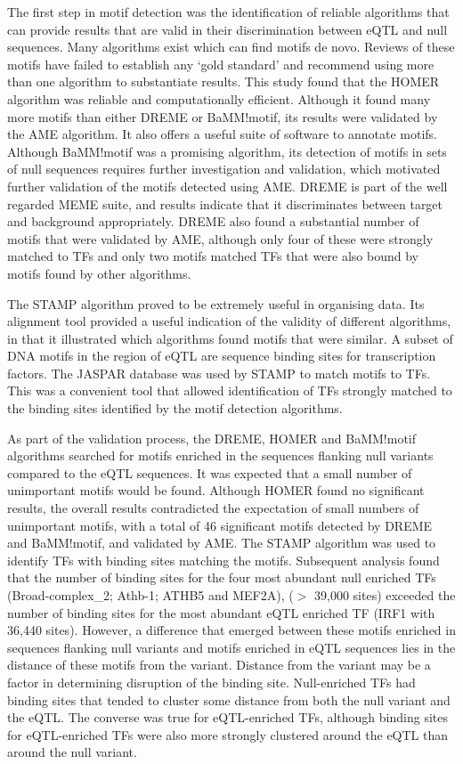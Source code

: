 \documentclass[12pt]{article}
\begin{document}
The first step in motif detection was the identification of reliable algorithms that can provide results that are valid in their discrimination between eQTL and null sequences. Many algorithms exist which can find motifs de novo. Reviews of these motifs have failed to establish any `gold standard' and \citet{tran2014survey} recommend using more than one algorithm to substantiate results. This study found that the HOMER algorithm was reliable and computationally efficient. Although it found many more motifs than either DREME or BaMM!motif, its results were validated by the AME algorithm. It also offers a useful suite of software to annotate motifs. Although BaMM!motif was a promising algorithm, its detection of motifs in sets of null sequences requires further investigation and validation, which motivated further validation of the motifs detected using AME. DREME is part of the well regarded MEME suite, and results indicate that it discriminates between target and background appropriately. DREME also found a substantial number of motifs that were validated by AME, although only four of these were strongly matched to TFs and only two motifs matched TFs that were also bound by motifs found by other algorithms.

The STAMP algorithm proved to be extremely useful in organising data. Its alignment tool provided a useful indication of the validity of different algorithms, in that it illustrated which algorithms found motifs that were similar. A subset of DNA motifs in the region of eQTL are sequence binding sites for transcription factors. The JASPAR database \citep{Mathelier2016} was used by STAMP to match motifs to TFs. This was a convenient tool that allowed identification of TFs strongly matched to the binding sites identified by the motif detection algorithms. 

As part of the validation process, the DREME, HOMER and BaMM!motif algorithms searched for motifs enriched in the sequences flanking null variants compared to the eQTL sequences. It was expected that a small number of unimportant motifs would be found. Although HOMER found no significant results, the overall results contradicted the expectation of small numbers of unimportant motifs, with a total of 46 significant motifs detected by DREME and BaMM!motif, and validated by AME. The STAMP algorithm was used to identify TFs with binding sites matching the motifs. Subsequent analysis found that the number of binding sites for the four most abundant null enriched TFs (Broad-complex{\_}2; Athb-1; ATHB5 and MEF2A), ($>$ 39,000 sites) exceeded the number of binding sites for the most abundant eQTL enriched TF (IRF1 with 36,440 sites).  However, a difference that emerged between these motifs enriched in sequences flanking null variants and motifs enriched in eQTL sequences lies in the distance of these motifs from the variant.
Distance from the variant may be a factor in determining disruption of the binding site. Null-enriched TFs had binding sites that tended to cluster some distance from both the null variant and the eQTL. The converse was true for eQTL-enriched TFs, although binding sites for eQTL-enriched TFs were also more strongly clustered around the eQTL than around the null variant.
\end{document}
